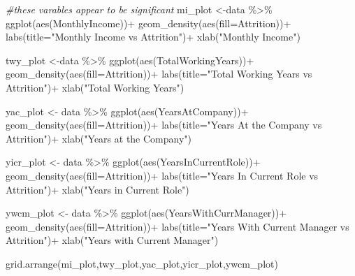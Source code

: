 \documentclass[
]{article}
\newenvironment{Shaded}{\begin{snugshade}}{\end{snugshade}}
\newcommand{\AttributeTok}[1]{\textcolor[rgb]{0.77,0.63,0.00}{#1}}
\newcommand{\CommentTok}[1]{\textcolor[rgb]{0.56,0.35,0.01}{\textit{#1}}}
\newcommand{\FunctionTok}[1]{\textcolor[rgb]{0.00,0.00,0.00}{#1}}
\newcommand{\NormalTok}[1]{#1}
\newcommand{\OtherTok}[1]{\textcolor[rgb]{0.56,0.35,0.01}{#1}}
\newcommand{\SpecialCharTok}[1]{\textcolor[rgb]{0.00,0.00,0.00}{#1}}
\newcommand{\StringTok}[1]{\textcolor[rgb]{0.31,0.60,0.02}{#1}}
\begin{document}
\begin{Shaded}
\begin{Highlighting}[]
\CommentTok{\#these varables appear to be significant}
\NormalTok{mi\_plot }\OtherTok{\textless{}{-}}\NormalTok{data }\SpecialCharTok{\%\textgreater{}\%} \FunctionTok{ggplot}\NormalTok{(}\FunctionTok{aes}\NormalTok{(MonthlyIncome))}\SpecialCharTok{+}
  \FunctionTok{geom\_density}\NormalTok{(}\FunctionTok{aes}\NormalTok{(}\AttributeTok{fill=}\NormalTok{Attrition))}\SpecialCharTok{+}
  \FunctionTok{labs}\NormalTok{(}\AttributeTok{title=}\StringTok{"Monthly Income vs Attrition"}\NormalTok{)}\SpecialCharTok{+}
  \FunctionTok{xlab}\NormalTok{(}\StringTok{"Monthly Income"}\NormalTok{)}

\NormalTok{twy\_plot }\OtherTok{\textless{}{-}}\NormalTok{data }\SpecialCharTok{\%\textgreater{}\%} \FunctionTok{ggplot}\NormalTok{(}\FunctionTok{aes}\NormalTok{(TotalWorkingYears))}\SpecialCharTok{+}
  \FunctionTok{geom\_density}\NormalTok{(}\FunctionTok{aes}\NormalTok{(}\AttributeTok{fill=}\NormalTok{Attrition))}\SpecialCharTok{+}
  \FunctionTok{labs}\NormalTok{(}\AttributeTok{title=}\StringTok{"Total Working Years vs Attrition"}\NormalTok{)}\SpecialCharTok{+}
  \FunctionTok{xlab}\NormalTok{(}\StringTok{"Total Working Years"}\NormalTok{)}

\NormalTok{yac\_plot }\OtherTok{\textless{}{-}}\NormalTok{ data }\SpecialCharTok{\%\textgreater{}\%} \FunctionTok{ggplot}\NormalTok{(}\FunctionTok{aes}\NormalTok{(YearsAtCompany))}\SpecialCharTok{+}
  \FunctionTok{geom\_density}\NormalTok{(}\FunctionTok{aes}\NormalTok{(}\AttributeTok{fill=}\NormalTok{Attrition))}\SpecialCharTok{+}
  \FunctionTok{labs}\NormalTok{(}\AttributeTok{title=}\StringTok{"Years At the Company vs Attrition"}\NormalTok{)}\SpecialCharTok{+}
  \FunctionTok{xlab}\NormalTok{(}\StringTok{"Years at the Company"}\NormalTok{)}

\NormalTok{yicr\_plot }\OtherTok{\textless{}{-}}\NormalTok{ data }\SpecialCharTok{\%\textgreater{}\%} \FunctionTok{ggplot}\NormalTok{(}\FunctionTok{aes}\NormalTok{(YearsInCurrentRole))}\SpecialCharTok{+}
  \FunctionTok{geom\_density}\NormalTok{(}\FunctionTok{aes}\NormalTok{(}\AttributeTok{fill=}\NormalTok{Attrition))}\SpecialCharTok{+}
  \FunctionTok{labs}\NormalTok{(}\AttributeTok{title=}\StringTok{"Years In Current Role vs Attrition"}\NormalTok{)}\SpecialCharTok{+}
  \FunctionTok{xlab}\NormalTok{(}\StringTok{"Years in Current Role"}\NormalTok{)}

\NormalTok{ywcm\_plot }\OtherTok{\textless{}{-}}\NormalTok{ data }\SpecialCharTok{\%\textgreater{}\%} \FunctionTok{ggplot}\NormalTok{(}\FunctionTok{aes}\NormalTok{(YearsWithCurrManager))}\SpecialCharTok{+}
  \FunctionTok{geom\_density}\NormalTok{(}\FunctionTok{aes}\NormalTok{(}\AttributeTok{fill=}\NormalTok{Attrition))}\SpecialCharTok{+}
  \FunctionTok{labs}\NormalTok{(}\AttributeTok{title=}\StringTok{"Years With Current Manager vs Attrition"}\NormalTok{)}\SpecialCharTok{+}
  \FunctionTok{xlab}\NormalTok{(}\StringTok{"Years with Current Manager"}\NormalTok{)}

\FunctionTok{grid.arrange}\NormalTok{(mi\_plot,twy\_plot,yac\_plot,yicr\_plot,ywcm\_plot)}
\end{Highlighting}
\end{Shaded}
\end{document}
